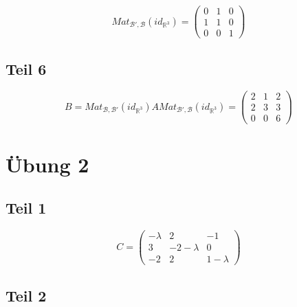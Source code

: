 \documentclass[a4paper,10pt]{article}
\begin{document}
\begin{equation}
 Mat_{\mathcal{B}',\mathcal{B}}(id_{\mathbb{R}^3}) =
  \begin{pmatrix}
   0 & 1 & 0\\
   1 & 1 & 0\\
   0 & 0 & 1
  \end{pmatrix}
\end{equation}

\subsection*{Teil 6}

\begin{equation}
 B = Mat_{\mathcal{B},\mathcal{B}'}(id_{\mathbb{R}^3})AMat_{\mathcal{B}',\mathcal{B}}(id_{\mathbb{R}^3}) = 
  \begin{pmatrix}
   2 & 1 & 2\\
   2 & 3 & 3\\
   0 & 0 & 6
  \end{pmatrix}
\end{equation}

\section*{Übung 2}

\subsection*{Teil 1}

\begin{equation}
 C = 
  \begin{pmatrix}
   -\lambda & 2 & -1\\
   3 & -2 - \lambda & 0\\
   -2 & 2 & 1 - \lambda
  \end{pmatrix}
\end{equation}

\subsection*{Teil 2}
\end{document}
